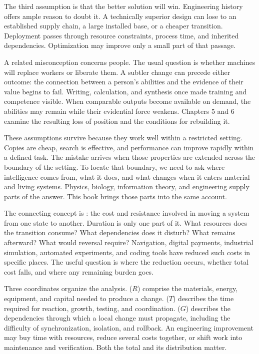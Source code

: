 The third assumption is that the better solution will win. Engineering history offers ample reason to doubt it. A technically superior design can lose to an established supply chain, a large installed base, or a cheaper transition. Deployment passes through resource constraints, process time, and inherited dependencies. Optimization may improve only a small part of that passage.

A related misconception concerns people. The usual question is whether machines will replace workers or liberate them. A subtler change can precede either outcome: the connection between a person's abilities and the evidence of their value begins to fail. Writing, calculation, and synthesis once made training and competence visible. When comparable outputs become available on demand, the abilities may remain while their evidential force weakens. Chapters 5 and 6 examine the resulting loss of position and the conditions for rebuilding it.

These assumptions survive because they work well within a restricted setting. Copies are cheap, search is effective, and performance can improve rapidly within a defined task. The mistake arrives when those properties are extended across the boundary of the setting. To locate that boundary, we need to ask where intelligence comes from, what it does, and what changes when it enters material and living systems. Physics, biology, information theory, and engineering supply parts of the answer. This book brings those parts into the same account.

The connecting concept is : the cost and resistance involved in moving a system from one state to another. Duration is only one part of it. What resources does the transition consume? What dependencies does it disturb? What remains afterward? What would reversal require? Navigation, digital payments, industrial simulation, automated experiments, and coding tools have reduced such costs in specific places. The useful question is where the reduction occurs, whether total cost falls, and where any remaining burden goes.

Three coordinates organize the analysis.  ($R$) comprise the materials, energy, equipment, and capital needed to produce a change.  ($T$) describes the time required for reaction, growth, testing, and coordination.  ($G$) describes the dependencies through which a local change must propagate, including the difficulty of synchronization, isolation, and rollback. An engineering improvement may buy time with resources, reduce several costs together, or shift work into maintenance and verification. Both the total and its distribution matter.

